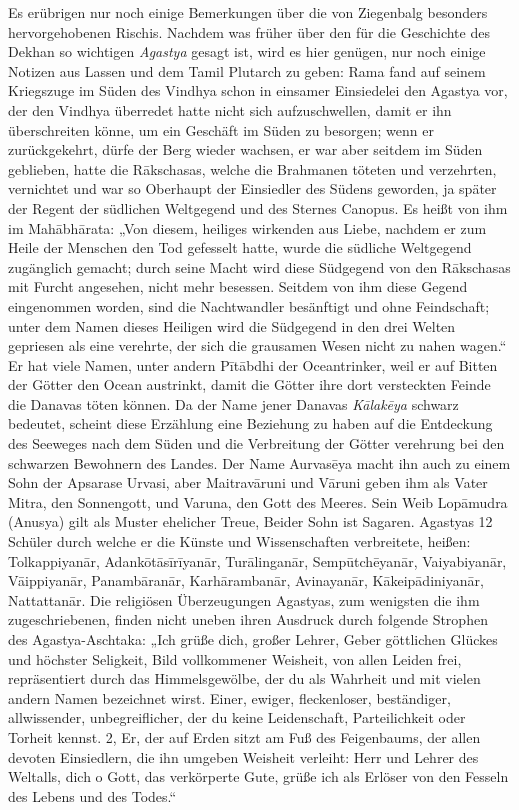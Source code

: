 \documentclass{article}
\begin{document}
Es erübrigen nur noch einige Bemerkungen über die von Ziegenbalg besonders hervorgehobenen Rischis. Nachdem was früher über den für die Geschichte des Dekhan so wichtigen \emph{Agastya} gesagt ist, wird es hier genügen, nur noch einige Notizen aus Lassen und dem Tamil Plutarch zu geben: Rama fand auf seinem Kriegszuge im Süden des Vindhya schon in einsamer Einsiedelei den Agastya vor, der den Vindhya überredet hatte nicht sich aufzuschwellen, damit er ihn überschreiten könne, um ein Geschäft im Süden zu besorgen; wenn er zurückgekehrt, dürfe der Berg wieder wachsen, er war aber seitdem im Süden geblieben, hatte die R\={a}kschasas, welche die Brahmanen töteten und verzehrten, vernichtet und war so Oberhaupt der Einsiedler des Südens geworden, ja später der Regent der südlichen Weltgegend und des Sternes Canopus. Es heißt von ihm im Mah\={a}bh\={a}rata: „Von diesem, heiliges wirkenden aus Liebe, nachdem er zum Heile der Menschen den Tod gefesselt hatte, wurde die südliche Weltgegend zugänglich gemacht; durch seine Macht wird diese Südgegend von den R\={a}kschasas mit Furcht angesehen, nicht mehr besessen. Seitdem von ihm diese Gegend eingenommen worden, sind die Nachtwandler besänftigt und ohne Feindschaft; unter dem Namen dieses Heiligen wird die Südgegend in den drei Welten gepriesen als eine verehrte, der sich die grausamen Wesen nicht zu nahen wagen.“ Er hat viele Namen, unter andern P\={i}t\={a}bdhi der Oceantrinker, weil er auf Bitten der Götter den Ocean austrinkt, damit die Götter ihre dort versteckten Feinde die Danavas töten können. Da der Name jener Danavas \emph{K\={a}lak\={e}ya} schwarz bedeutet, scheint diese Erzählung eine Beziehung zu haben auf die Entdeckung des Seeweges nach dem Süden und die Verbreitung der Götter verehrung bei den schwarzen Bewohnern des Landes. Der Name Aurvas\={e}ya macht ihn auch zu einem Sohn der Apsarase Urvasi, aber Maitrav\={a}runi und V\={a}runi geben ihm als Vater Mitra, den Sonnengott, und Varuna, den Gott des Meeres. Sein Weib Lop\={a}mudra (Anusya) gilt als Muster ehelicher Treue, Beider Sohn ist Sagaren. Agastyas 12 Schüler durch welche er die Künste und Wissenschaften verbreitete, heißen: Tolkappiyan\={a}r, Adank\={o}t\={a}s\={i}r\={i}yan\={a}r, Tur\={a}lingan\={a}r, Semp\={u}tch\={e}yan\={a}r, Vaiyabiyan\={a}r, V\={a}ippiyan\={a}r, Panamb\={a}ran\={a}r, Karh\={a}ramban\={a}r, Avinayan\={a}r, K\={a}keip\={a}diniyan\={a}r, Nattattan\={a}r. Die religiösen Überzeugungen Agastyas, zum wenigsten die ihm zugeschriebenen, finden nicht uneben ihren Ausdruck durch folgende Strophen des Agastya-Aschtaka: „Ich grüße dich, großer Lehrer, Geber göttlichen Glückes und höchster Seligkeit, Bild vollkommener Weisheit, von allen Leiden frei, repräsentiert durch das Himmelsgewölbe, der du als Wahrheit und mit vielen andern Namen bezeichnet wirst. Einer, ewiger, fleckenloser, beständiger, allwissender, unbegreiflicher, der du keine Leidenschaft, Parteilichkeit oder Torheit kennst. 2, Er, der auf Erden sitzt am Fuß des Feigenbaums, der allen devoten Einsiedlern, die ihn umgeben Weisheit verleiht: Herr und Lehrer des Weltalls, dich o Gott, das verkörperte Gute, grüße ich als Erlöser von den Fesseln des Lebens und des Todes.“
\end{document}
